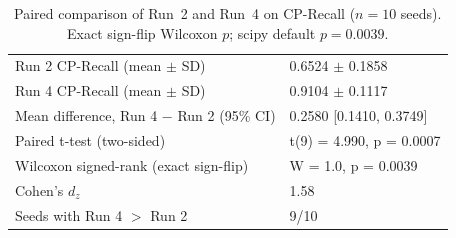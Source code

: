 \begin{table}[t]
\centering
\caption{Paired comparison of Run~2 and Run~4 on CP-Recall ($n=10$ seeds). Exact sign-flip Wilcoxon $p$; scipy default $p=0.0039$.}
\label{tab:stats}
\begin{tabular}{ll}
\hline
Run 2 CP-Recall (mean $\pm$ SD) & 0.6524 $\pm$ 0.1858 \\
Run 4 CP-Recall (mean $\pm$ SD) & 0.9104 $\pm$ 0.1117 \\
Mean difference, Run 4 $-$ Run 2 (95\% CI) & 0.2580 [0.1410, 0.3749] \\
Paired t-test (two-sided) & t(9) = 4.990, p = 0.0007 \\
Wilcoxon signed-rank (exact sign-flip) & W = 1.0, p = 0.0039 \\
Cohen's $d_z$ & 1.58 \\
Seeds with Run 4 $>$ Run 2 & 9/10 \\
\hline
\end{tabular}
\end{table}
